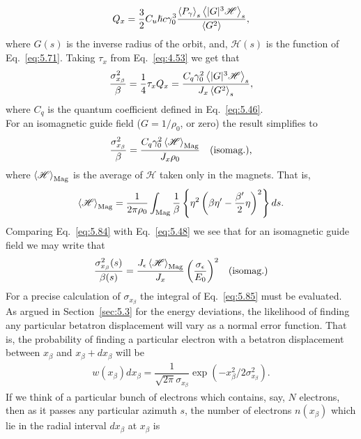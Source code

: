 \begin{align}
	Q_x = \dfrac{3}{2} C_u \hslash c \gamma_0^3 \dfrac{\left< P_\gamma \right>_s \left< |G|^3\mathscr{H} \right>_s}{\left< G^2 \right>},
\end{align}
where $G(s)$ is the inverse radius of the orbit, and, $\mathscr{H}(s)$ is the function of Eq.~\eqref{eq:5.71}. Taking $\tau_x$ from Eq.~\eqref{eq:4.53} we get that
\begin{align}
	\dfrac{\sigma_{x_\beta}^2}{\beta} = \dfrac{1}{4} \tau_x Q_x = \dfrac{C_q \gamma_0^2 \left< |G|^3\mathscr{H} \right>_s}{J_x \left< G^2 \right>_s},
\end{align}
where $C_q$ is the quantum coefficient defined in Eq.~\eqref{eq:5.46}.\\
For an isomagnetic guide field ($G = 1/\rho_0$, or zero) the result simplifies to
\begin{align}\label{eq:5.84}
	\dfrac{\sigma_{x_\beta}^2}{\beta} =\dfrac{C_q \gamma_0^2 \left< \mathscr{H} \right>_\text{Mag}}{J_x \rho_0} && \text{(isomag.),}
\end{align}
where $\left< \mathscr{H} \right>_\text{Mag}$ is the average of $\mathscr{H}$ taken only in the magnets.
 That is,
\begin{align}\label{eq:5.85}
	\left< \mathscr{H} \right>_\text{Mag} = \dfrac{1}{2\pi\rho_0} \int_\text{Mag} \dfrac{1}{\beta}\left\lbrace \eta^2 \left( \beta\eta' - \dfrac{\beta'}{2} \eta \right)^2 \right\rbrace ds.
\end{align}
Comparing Eq.~\eqref{eq:5.84} with Eq.~\eqref{eq:5.48} we see that for an isomagnetic guide
field we may write that
\begin{align}\label{eq:5.86}
	\dfrac{\sigma_{x_\beta}^2(s)}{\beta(s)} =  \dfrac{J_\epsilon \left< \mathscr{H} \right>_\text{Mag}}{J_x} \left( \dfrac{\sigma_\epsilon}{E_0} \right)^2 && \text{(isomag.)}
\end{align}
For a precise calculation of $\sigma_{x_\beta}$ the integral of Eq.~\eqref{eq:5.85} must be evaluated.\\
As argued in Section~\ref{sec:5.3} for the energy deviations, the likelihood of finding
any particular betatron displacement will vary as a normal error function. That is, the probability of finding a particular electron with a betatron displacement between $x_\beta$ and $x_\beta + dx_\beta$ will be
\begin{align}
	w(x_\beta)dx_\beta = \dfrac{1}{\sqrt{2\pi} \sigma_{x_\beta}} \exp\left( -x_\beta^2/2\sigma_{x_\beta}^2 \right).
\end{align}
If we think of a particular bunch of electrons which contains, say, $N$ electrons, then as it passes any particular azimuth $s$, the number of electrons $n(x_\beta)$ which lie in the radial interval $dx_\beta$ at $x_\beta$ is
